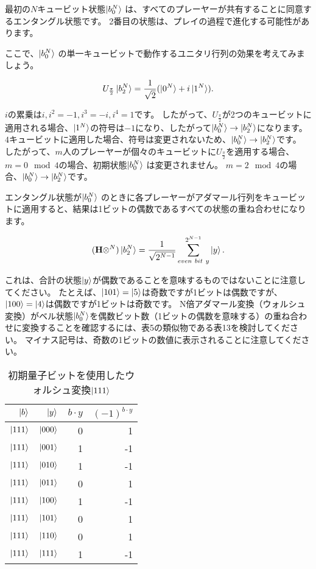 最初の$N$キュービット状態$\ket{b_0^N}$ は、すべてのプレーヤーが共有することに同意するエンタングル状態です。 2番目の状態は、プレイの過程で進化する可能性があります。

ここで、$\ket{b_0^N}$ の単一キュービットで動作するユニタリ行列の効果を考えてみましょう。

\begin{equation}
\label{202}
U_{\frac{\pi}{2}}
\ket{b_2^N}
=
\frac{1}{\sqrt{2}}(\ket{0^N} + i \ket{1^N} ).
\end{equation}

$i$の累乗は$i, i^2 = -1, i^3 = -i, i^4 = 1$です。 したがって、$U_{\frac{\pi}{2}}$が2つのキュービットに適用される場合、$\ket{1^N}$の符号は$-1$になり、したがって$ \ket{b_0^N} \to \ket{b_2^N}$になります。 $4$キュービットに適用した場合、符号は変更されないため、$ \ket{b_0^N} \to \ket{b_2^N}$です。 したがって、$m$人のプレーヤーが個々のキュービットに$U_{\frac{\pi}{2}}$を適用する場合、$m = 0 \mod 4$の場合、初期状態$\ket{b_0^N}$ は変更されません。
$m = 2 \mod 4$の場合、$ \ket{b_0^N} \to \ket{b_2^N}$です。

エンタングル状態が$\ket{b_0^N}$ のときに各プレーヤーがアダマール行列をキュービットに適用すると、結果は1ビットの偶数であるすべての状態の重ね合わせになります。

\begin{equation}
\label{203}
(\mathbf{H} \otimes ^N)
\ket{b_2^N}
=
\frac{1}{\sqrt{2^{N-1}}}  \sum_{even \ bit \ y}^{2^{N-1}} \ket{y} .
\end{equation}

これは、合計の状態$\ket{y}$が偶数であることを意味するものではないことに注意してください。
たとえば、$\ket{101} = \ket{5}$は奇数ですが1ビットは偶数ですが、$\ket{100} = \ket{4}$は偶数ですが1ビットは奇数です。
N倍アダマール変換（ウォルシュ変換）がベル状態$\ket{b_0^N}$を偶数ビット数（1ビットの偶数を意味する）の重ね合わせに変換することを確認するには、表5の類似物である表13を検討してください。
マイナス記号は、奇数の1ビットの数値に表示されることに注意してください。

\begin{table}[htb]
\caption{初期量子ビットを使用したウォルシュ変換$\ket{111}$}
\centering
\begin{tabular}{|r|r|r|r|} \hline
$\ket{b}$ & $\ket{y}$ & $b \cdot y$ & $ (-1)^{b \cdot y}$ \\ \hline
$\ket{111}$ & $\ket{000}$ & 0 & 1 \\
$\ket{111}$ & $\ket{001}$ & 1 & -1 \\
$\ket{111}$ & $\ket{010}$ & 1 & -1 \\
$\ket{111}$ & $\ket{011}$ & 0 & 1 \\
$\ket{111}$ & $\ket{100}$ & 1 & -1 \\
$\ket{111}$ & $\ket{101}$ & 0 & 1 \\
$\ket{111}$ & $\ket{110}$ & 0 & 1 \\
$\ket{111}$ & $\ket{111}$ & 1 & -1 \\ \hline
\end{tabular}
\end{table} 

